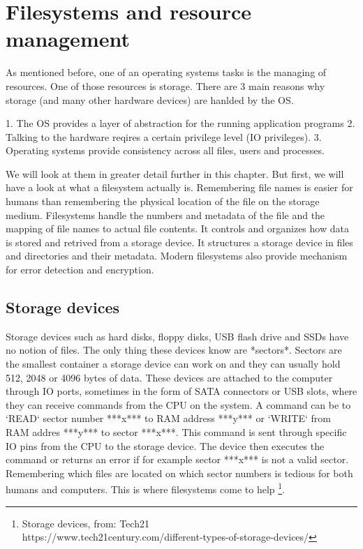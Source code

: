 \section{Filesystems and resource management}

As mentioned before, one of an operating systems tasks is the managing of resources.
One of those resources is storage. There are 3 main reasons why storage (and many other
hardware devices) are hanlded by the OS.

1. The OS provides a layer of abstraction for the running application programs
2. Talking to the hardware reqires a certain privilege level (IO privileges).
3. Operating systems provide consistency across all files, users and processes.

We will look at them in greater detail further in this chapter.
But first, we will have a look at what a filesystem actually is. Remembering file names is easier for
humans than remembering the physical location of the file on the storage medium. Filesystems handle
the numbers and metadata of the file and the mapping of file names to actual file contents. It
controls and organizes how data is stored and retrived from a storage device. It structures a storage
device in files and directories and their metadata. Modern filesystems also provide mechanism for
error detection and encryption.

\subsection{Storage devices}

Storage devices such as hard disks, floppy disks, USB flash drive and SSDs have no notion of files.
The only thing these devices know are *sectors*. Sectors are the smallest container a storage device
can work on and they can usually hold 512, 2048 or 4096 bytes of data. These devices are attached to
the computer through IO ports, sometimes in the form of SATA connectors or USB slots, where they can
receive commands from the CPU on the system. A command can be to `READ` sector number ***x*** to RAM
address ***y*** or `WRITE` from RAM addres ***y*** to sector ***x***. This command is sent through
specific IO pins from the CPU to the storage device. The device then executes the command or returns
an error if for example sector ***x*** is not a valid sector. Remembering which files are located on
which sector numbers is tedious for both humans and computers. This is where filesystems come to help
\footnote{Storage devices, from: Tech21  \\ https://www.tech21century.com/different-types-of-storage-devices/}.

